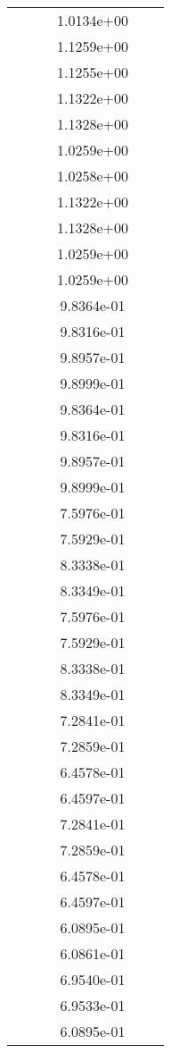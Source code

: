 \begin{xltabular}{\textwidth}{r|rS[table-format=1.3e+2]S[table-format=1.4e+2]S[table-format=1.4e+2]S[table-format=-1.5]}
&  &  & 1.0134e+00 & & \\
&  &  & 1.1259e+00 & & \\
&  &  & 1.1255e+00 & & \\
&  &  & 1.1322e+00 & & \\
&  &  & 1.1328e+00 & & \\
&  &  & 1.0259e+00 & & \\
&  &  & 1.0258e+00 & & \\
&  &  & 1.1322e+00 & & \\
&  &  & 1.1328e+00 & & \\
&  &  & 1.0259e+00 & & \\
&  &  & 1.0259e+00 & & \\
&  &  & 9.8364e-01 & & \\
&  &  & 9.8316e-01 & & \\
&  &  & 9.8957e-01 & & \\
&  &  & 9.8999e-01 & & \\
&  &  & 9.8364e-01 & & \\
&  &  & 9.8316e-01 & & \\
&  &  & 9.8957e-01 & & \\
&  &  & 9.8999e-01 & & \\
&  &  & 7.5976e-01 & & \\
&  &  & 7.5929e-01 & & \\
&  &  & 8.3338e-01 & & \\
&  &  & 8.3349e-01 & & \\
&  &  & 7.5976e-01 & & \\
&  &  & 7.5929e-01 & & \\
&  &  & 8.3338e-01 & & \\
&  &  & 8.3349e-01 & & \\
&  &  & 7.2841e-01 & & \\
&  &  & 7.2859e-01 & & \\
&  &  & 6.4578e-01 & & \\
&  &  & 6.4597e-01 & & \\
&  &  & 7.2841e-01 & & \\
&  &  & 7.2859e-01 & & \\
&  &  & 6.4578e-01 & & \\
&  &  & 6.4597e-01 & & \\
&  &  & 6.0895e-01 & & \\
&  &  & 6.0861e-01 & & \\
&  &  & 6.9540e-01 & & \\
&  &  & 6.9533e-01 & & \\
&  &  & 6.0895e-01 & & \\

\end{xltabular}
